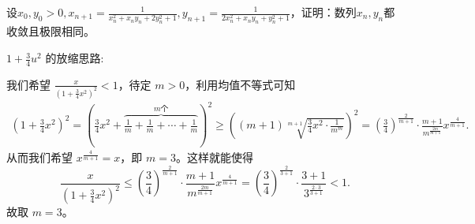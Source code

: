\documentclass[../../main.tex]{subfiles}
\begin{document}
\begin{example}
设\(x_0,y_0 > 0,x_{n + 1}=\frac{1}{x_n^2 + x_ny_n + 2y_n^2 + 1},y_{n + 1}=\frac{1}{2x_n^2 + x_ny_n + y_n^2 + 1}\)，证明：数列\(x_n,y_n\)都收敛且极限相同。
\end{example}
\begin{remark}
\hypertarget{均值放缩的思路}{\(1+\frac{3}{4}u^2\) 的放缩思路:}我们希望 \(\frac{x}{(1+\frac{3}{4}x^2)^2}<1\)，待定 \(m > 0\)，利用均值不等式可知
\begin{align*}
\left(1+\frac{3}{4}x^2\right)^2=\left(\frac{3}{4}x^2+\overbrace{\frac{1}{m}+\frac{1}{m}+\cdots +\frac{1}{m}}^{m\text{个}}\right)^2
\geqslant \left((m + 1)\sqrt[m + 1]{\frac{3}{4}x^2\cdot\frac{1}{m^m}}\right)^2
=\left(\frac{3}{4}\right)^{\frac{2}{m + 1}}\cdot\frac{m + 1}{m^{\frac{2m}{m + 1}}}x^{\frac{4}{m + 1}}.
\end{align*}
从而我们希望 \(x^{\frac{4}{m + 1}} = x\)，即 \(m = 3\)。这样就能使得
\[
\frac{x}{(1+\frac{3}{4}x^2)^2}\leqslant \left(\frac{3}{4}\right)^{\frac{2}{m + 1}}\cdot\frac{m + 1}{m^{\frac{2m}{m + 1}}}x^{\frac{4}{m + 1}}=\left(\frac{3}{4}\right)^{\frac{2}{3 + 1}}\cdot\frac{3 + 1}{3^{\frac{2\cdot 3}{3 + 1}}}<1.
\]
故取 \(m = 3\)。
\end{remark}
\end{document}
